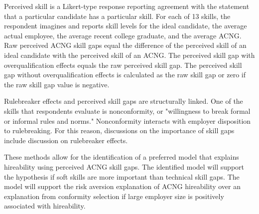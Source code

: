 \documentclass[review]{elsarticle}
\begin{document}
Perceived skill is a Likert-type response reporting agreement with the statement that a particular candidate has a particular skill.
For each of 13 skills, the respondent imagines and reports skill levels for the ideal candidate,
the average actual employee,
the average recent college graduate,
and the average ACNG.
Raw perceived ACNG skill gaps equal the difference of the perceived skill of an ideal candidate with the perceived skill of an ACNG.
The perceived skill gap with overqualification effects equals the raw perceived skill gap.
The perceived skill gap without overqualification effects is calculated as the raw skill gap or zero if the raw skill gap value is negative.

Rulebreaker effects and perceived skill gaps are structurally linked.
One of the skills that respondents evaluate is nonconformity, or "willingness to break formal or informal rules and norms."
Nonconformity interacts with employer disposition to rulebreaking.
For this reason, discussions on the importance of skill gaps include discussion on rulebreaker effects.


These methods allow for the identification of a preferred model that explains hireability using perceived ACNG skill gaps.
The identified model will support the hypothesis if soft skills are more important than technical skill gaps. %
The model will support the risk aversion explanation of ACNG hireability over an explanation from conformity selection if large employer size is positively associated with hireability.
\end{document}
